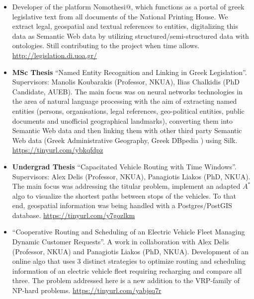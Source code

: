 \documentclass[a4paper,oneside,10pt]{article}
\begin{document}
\begin{itemize}
\begin{sloppypar}
\end{sloppypar}

\item Developer of the platform Nomothesi@, which functions as a portal of greek legislative text from all documents of the National Printing House. We extract legal, geospatial and textual references to entities, digitalizing this data as Semantic Web data by utilizing structured/semi-structured data with ontologies. Still contributing to the project when time allows. \url{http://legislation.di.uoa.gr/}

\item \begin{sloppypar}
\textbf{MSc Thesis} ``Named Entity Recognition and Linking in Greek Legislation''. Supervisors: Manolis Koubarakis (Professor, NKUA), Ilias Chalkidis (PhD Candidate, AUEB).
The main focus was on neural networks technologies in the area of natural language processing with the aim of extracting named entities (persons, organisations, legal references, geo-political entities, public documents and unofficial geographical landmarks), 
converting them into Semantic Web data and then linking them with other third party Semantic Web data (Greek Administrative Geography, Greek DBpedia ) using Silk. \url{https://tinyurl.com/ybkqfdpz}

\end{sloppypar}

\item \begin{sloppypar}
\textbf{Undergrad Thesis} ``Capacitated Vehicle Routing with Time Windows''. Supervisors: Alex Delis (Professor, NKUA), Panagiotis Liakos (PhD, NKUA). 
The main focus was addressing the titular problem, implement an adapted $A^{*}$ algo to visualize the shortest paths between stops of the vehicles. To that end, geospatial information was being handled with a Postgres/PostGIS database. \url{https://tinyurl.com/y7gozlkm}

\end{sloppypar}

\item \begin{sloppypar}
``Cooperative Routing and Scheduling of an Electric Vehicle Fleet Managing Dynamic Customer Requests''. A work in collaboration with Alex Delis (Professor, NKUA) and Panagiotis Liakos (PhD, NKUA). 
Development of an online algo that uses 3 distinct strategies to optimize routing and scheduling information of an electric vehicle fleet requiring recharging and compare all three. The problem addressed here is a new addition to the VRP-family of NP-hard problems. \url{https://tinyurl.com/yabjsq7r}


\end{sloppypar}
\end{itemize}
\end{document}

